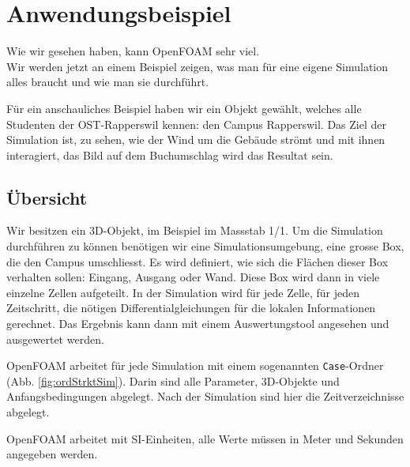 %
%
%
%
\section{Anwendungsbeispiel
\label{openfoam:section:Anwendungsbeispiel}}
Wie wir gesehen haben, kann OpenFOAM sehr viel.\\

Wir werden jetzt an einem Beispiel zeigen, was man für eine eigene Simulation alles braucht und wie man sie durchführt.

Für ein anschauliches Beispiel haben wir ein Objekt gewählt, welches alle Studenten der OST-Rapperswil kennen: den Campus Rapperswil.
Das Ziel der Simulation ist, zu sehen, wie der Wind um die Gebäude strömt und mit ihnen interagiert, das Bild auf dem Buchumschlag wird das Resultat sein.

\subsection{Übersicht \label{openfoam:section:Übersicht}}
Wir besitzen ein 3D-Objekt, im Beispiel im Massstab 1/1.
Um die Simulation durchführen zu können benötigen wir eine Simulationsumgebung, eine grosse Box, die den Campus umschliesst.
Es wird definiert, wie sich die Flächen dieser Box verhalten sollen: Eingang, Ausgang oder Wand.
Diese Box wird dann in viele einzelne Zellen aufgeteilt.
In der Simulation wird für jede Zelle, für jeden Zeitschritt, 
die nötigen Differentialgleichungen für die lokalen Informationen gerechnet.
Das Ergebnis kann dann mit einem Auswertungstool angesehen und ausgewertet werden.

OpenFOAM arbeitet für jede Simulation mit einem sogenannten \texttt{Case}-Ordner (Abb. \ref{fig:ordStrktSim}). 
Darin sind alle Parameter, 3D-Objekte und Anfangsbedingungen abgelegt.
Nach der Simulation sind hier die Zeitverzeichnisse abgelegt.

\begin{center}
        OpenFOAM arbeitet mit SI-Einheiten, alle Werte müssen in Meter und Sekunden angegeben werden.
\end{center}

